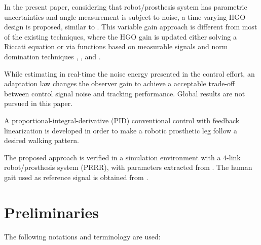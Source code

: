 \documentclass[letterpaper, 10 pt, conference]{ieeeconf}  %
\theoremstyle{plain}
\theoremstyle{definition}
\theoremstyle{remark}
\begin{document}
In the present paper, considering that robot/prosthesis system has parametric uncertainties and angle measurement is subject to noise, a time-varying HGO design is proposed, similar to \cite{POH:2011}. 
This variable gain approach is different from most of the existing techniques,
where the HGO gain is updated either solving a Riccati equation \cite{P:01}\cite{P:07}\cite{GAL:06} or via functions based on measurable signals and norm domination techniques \cite{LL:05}, \cite{P:07}, \cite{APA:09} and \cite{POH:2011}.

While estimating in real-time the noise energy presented in the control effort, an adaptation law changes the observer gain to achieve a acceptable trade-off between control signal noise and tracking performance. Global results are not pursued in this paper.

A proportional-integral-derivative (PID) conventional control with feedback linearization is developed in order to make a robotic prosthetic leg follow a desired walking pattern. 

The proposed approach is verified in a simulation environment with a $4$-link robot/prosthesis system (PRRR), with parameters extracted from \cite{Richter2015}. The human gait used as reference signal is obtained from \cite{Schwartz2008}.


\section{Preliminaries}


The following notations and terminology are used:%



\end{document}
